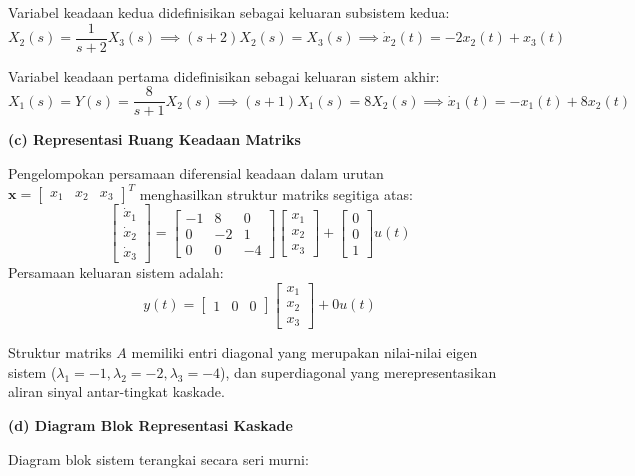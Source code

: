 \documentclass[11pt,a4paper]{article}
\begin{document}
Variabel keadaan kedua didefinisikan sebagai keluaran subsistem kedua:
$$X_2(s) = \frac{1}{s+2} X_3(s) \implies (s+2)X_2(s) = X_3(s) \implies \dot{x}_2(t) = -2x_2(t) + x_3(t)$$

Variabel keadaan pertama didefinisikan sebagai keluaran sistem akhir:
$$X_1(s) = Y(s) = \frac{8}{s+1} X_2(s) \implies (s+1)X_1(s) = 8X_2(s) \implies \dot{x}_1(t) = -x_1(t) + 8x_2(t)$$

\textbf{(c) Representasi Ruang Keadaan Matriks}

Pengelompokan persamaan diferensial keadaan dalam urutan $\mathbf{x} = \begin{bmatrix} x_1 & x_2 & x_3 \end{bmatrix}^T$ menghasilkan struktur matriks segitiga atas:
$$\begin{bmatrix} \dot{x}_1 \\ \dot{x}_2 \\ \dot{x}_3 \end{bmatrix} = \begin{bmatrix} -1 & 8 & 0 \\ 0 & -2 & 1 \\ 0 & 0 & -4 \end{bmatrix} \begin{bmatrix} x_1 \\ x_2 \\ x_3 \end{bmatrix} + \begin{bmatrix} 0 \\ 0 \\ 1 \end{bmatrix} u(t)$$
Persamaan keluaran sistem adalah:
$$y(t) = \begin{bmatrix} 1 & 0 & 0 \end{bmatrix} \begin{bmatrix} x_1 \\ x_2 \\ x_3 \end{bmatrix} + 0 u(t)$$

Struktur matriks $A$ memiliki entri diagonal yang merupakan nilai-nilai eigen sistem ($\lambda_1 = -1, \lambda_2 = -2, \lambda_3 = -4$), dan superdiagonal yang merepresentasikan aliran sinyal antar-tingkat kaskade.

\textbf{(d) Diagram Blok Representasi Kaskade}

Diagram blok sistem terangkai secara seri murni:
\begin{center}
\end{center}
\end{document}
